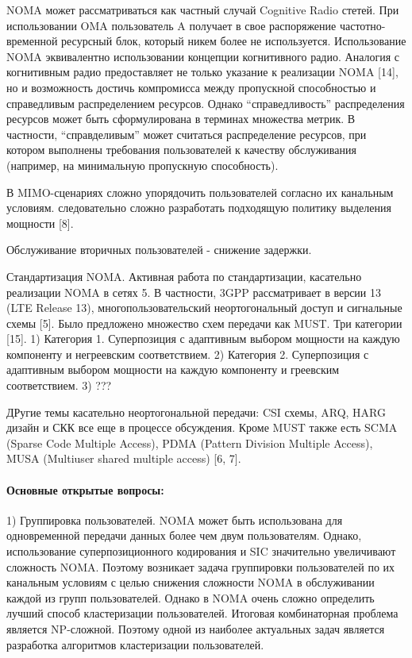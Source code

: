 \documentclass{book}
\numberwithin{theorem}{chapter}
\numberwithin{statement}{chapter}
\numberwithin{lemma}{chapter}
\theoremstyle{definition}
\numberwithin{task}{chapter}
\theoremstyle{remark}
\numberwithin{example}{chapter}
\theoremstyle{definition}
\numberwithin{definition}{chapter}
\theoremstyle{remark}
\theoremstyle{remark}
\numberwithin{lyrics}{section}
\begin{document}
	NOMA может рассматриваться как частный случай Cognitive Radio стетей. При использовании OMA пользователь A получает в свое распоряжение частотно-временной ресурсный блок, который никем более не используется. Использование NOMA эквивалентно использовании концепции когнитивного радио. Аналогия с когнитивным радио предоставляет не только указание к реализации NOMA [14], но и возможность достичь компромисса между пропускной способностью и справедливым распределением ресурсов. Однако ``справедливость'' распределения ресурсов может быть сформулирована в терминах множества метрик. В частности, ``справделивым'' может считаться распределение ресурсов, при котором выполнены требования пользователей к качеству обслуживания (например, на минимальную пропускную способность).
	
	В MIMO-сценариях сложно упорядочить пользователей согласно их канальным условиям. следовательно сложно разработать подходящую политику выделения мощности [8].
	
	Обслуживание вторичных пользователей - снижение задержки.
	
	Стандартизация NOMA. Активная работа по стандартизации, касательно реализации NOMA в сетях 5. В частности, 3GPP рассматривает в версии 13 (LTE Release 13), многопользовательский неортогональный доступ и сигнальные схемы [5]. Было предложено множество схем передачи как MUST. Три категории [15]. 
	1) Категория 1. Суперпозиция с адаптивным выбором мощности на каждую компоненту и негреевским соответствием.
	2) Категория 2. Суперпозиция с адаптивным выбором мощности на каждую компоненту и греевским соответствием.
	3) ???
	
	ДРугие темы касательно неортогональной передачи: CSI схемы, ARQ, HARG дизайн и СКК все еще в процессе обсуждения.
	Кроме MUST также есть SCMA (Sparse Code Multiple Access), PDMA (Pattern Division Multiple Access), MUSA (Multiuser shared multiple access) [6, 7].
	
	\paragraph{Основные открытые вопросы:}
	
	1) Группировка пользователей. NOMA может быть использована для одновременной передачи данных более чем двум пользователям. Однако, использование суперпозиционного кодирования и SIC значительно увеличивают сложность NOMA. Поэтому возникает задача группировки пользователей по их канальным условиям с целью снижения сложности NOMA в обслуживании каждой из групп пользователей. Однако в NOMA очень сложно определить лучший способ кластеризации пользователей. Итоговая комбинаторная проблема является NP-сложной. Поэтому одной из наиболее актуальных задач является разработка алгоритмов кластеризации пользователей.
	
\end{document}
